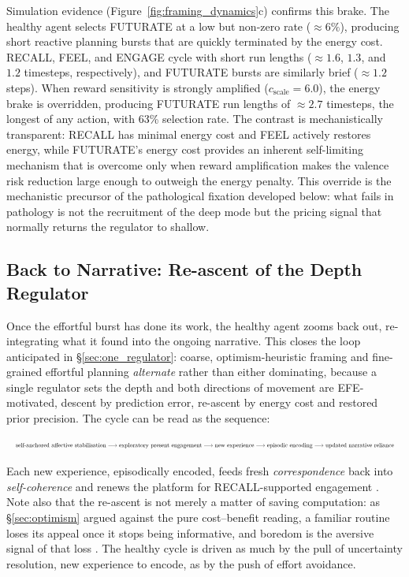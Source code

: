 \documentclass[11pt,a4paper]{article}
\newcommand{\rr}{\color{red!70!black}}
\begin{document}
Simulation evidence (Figure~\ref{fig:framing_dynamics}c) confirms this brake. The healthy agent selects FUTURATE at a low but non-zero rate ($\approx 6\%$), producing short reactive planning bursts that are quickly terminated by the energy cost. RECALL, FEEL, and ENGAGE cycle with short run lengths ($\approx 1.6$, $1.3$, and $1.2$ timesteps, respectively), and FUTURATE bursts are similarly brief ($\approx 1.2$ steps). When reward sensitivity is strongly amplified ($c_{\text{scale}} = 6.0$), the energy brake is overridden, producing FUTURATE run lengths of $\approx 2.7$ timesteps, the longest of any action, with 63\% selection rate. The contrast is mechanistically transparent: RECALL has minimal energy cost and FEEL actively restores energy, while FUTURATE's energy cost provides an inherent self-limiting mechanism that is overcome only when reward amplification makes the valence risk reduction large enough to outweigh the energy penalty. {\rr This override is the mechanistic precursor of the pathological fixation developed below: what fails in pathology is not the recruitment of the deep mode but the pricing signal that normally returns the regulator to shallow.}

\subsection{Back to Narrative: Re-ascent of the Depth Regulator}\label{sec:back_to_narrative}

{\rr Once the effortful burst has done its work, the healthy agent zooms back out, re-integrating what it found into the ongoing narrative. This closes the loop anticipated in \S\ref{sec:one_regulator}: coarse, optimism-heuristic framing and fine-grained effortful planning \emph{alternate} rather than either dominating, because a single regulator sets the depth and both directions of movement are EFE-motivated, descent by prediction error, re-ascent by energy cost and restored prior precision. The cycle can be read as the sequence:}

\[
\resizebox{\linewidth}{!}{$
\text{self-anchored affective stabilisation}
\longrightarrow
\text{exploratory present engagement}
\longrightarrow
\text{new experience}
\longrightarrow
\text{episodic encoding}
\longrightarrow
\text{updated narrative reliance}
$}
\]

{\rr Each new experience, episodically encoded, feeds fresh \emph{correspondence} back into \emph{self-coherence} and renews the platform for RECALL-supported engagement \citep{conwaysingertagini2004, schacteraddisbuckner2007}. Note also that the re-ascent is not merely a matter of saving computation: as \S\ref{sec:optimism} argued against the pure cost--benefit reading, a familiar routine loses its appeal once it stops being informative, and boredom is the aversive signal of that loss \citep{stephanetal2016, schwartenbecketal2019}. The healthy cycle is driven as much by the pull of uncertainty resolution, new experience to encode, as by the push of effort avoidance.}
\end{document}
